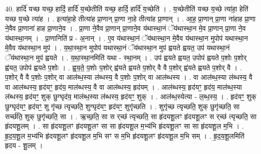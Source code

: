 \documentclass[17pt]{extarticle}
\begin{document}
40. हार्दि॑ यच्छ यच्छ॒ हार्दि॒ हार्दि॑ य॒च्छेतीति॑ यच्छ॒ हार्दि॒ हार्दि॑ य॒च्छेति॑ । . य॒च्छेतीति॑ यच्छ य॒च्छे त्या॑हा॒ हेति॑ यच्छ य॒च्छे त्या॑ह । . इत्या॑हा॒हे तीत्या॑ह प्रा॒णान् प्रा॒णा ना॒हे तीत्या॑ह प्रा॒णान् । . आ॒ह॒ प्रा॒णान् प्रा॒णा ना॑हाह प्रा॒णा ने॒वैव प्रा॒णाना॑ हाह प्रा॒णाने॒व । . प्रा॒णा ने॒वैव प्रा॒णान् प्रा॒णाने॒व य॑थास्था॒नं ॅय॑थास्था॒न मे॒व प्रा॒णान् प्रा॒णा ने॒व य॑थास्था॒नम् । . प्रा॒णानिति॑ प्र - अ॒नान् । . ए॒व य॑थास्था॒नं ॅय॑थास्था॒न मे॒वैव य॑थास्था॒न मुपोप॑ यथास्था॒न मे॒वैव य॑थास्था॒न मुप॑ । . य॒था॒स्था॒न मुपोप॑ यथास्था॒नं ॅय॑थास्था॒न मुप॑ ह्वयते ह्वयत॒ उप॑ यथास्था॒नं ॅय॑थास्था॒न मुप॑ ह्वयते । . य॒था॒स्था॒नमिति॑ यथा - स्था॒नम् । . उप॑ ह्वयते ह्वयत॒ उपोप॑ ह्वयते प॒शोः प॒शोर् ह्व॑यत॒ उपोप॑ ह्वयते प॒शोः । . ह्व॒य॒ते॒ प॒शोः प॒शोर् ह्व॑यते ह्वयते प॒शोर् वै वै प॒शोर् ह्व॑यते ह्वयते प॒शोर् वै । . प॒शोर् वै वै प॒शोः प॒शोर् वा आल॑ब्ध॒स्या ल॑ब्धस्य॒ वै प॒शोः प॒शोर् वा आल॑ब्धस्य । . वा आल॑ब्ध॒स्या ल॑ब्धस्य॒ वै वा आल॑ब्धस्य॒ हृद॑यꣳ॒॒ हृद॑य॒ माल॑ब्धस्य॒ वै वा आल॑ब्धस्य॒ हृद॑यम् । . आल॑ब्धस्य॒ हृद॑यꣳ॒॒ हृद॑य॒ माल॑ब्ध॒स्या ल॑ब्धस्य॒ हृद॑यꣳ॒॒ शुक् छुग्घृद॑य॒ माल॑ब्ध॒स्या ल॑ब्धस्य॒ हृद॑यꣳ॒॒ शुक् । . आल॑ब्ध॒स्येत्या - ल॒ब्ध॒स्य॒ । . हृद॑यꣳ॒॒ शुक् छुग्घृद॑यꣳ॒॒ हृद॑यꣳ॒॒ शु गृ॑च्छ त्यृच्छति॒ शुग्घृद॑यꣳ॒॒ हृद॑यꣳ॒॒ शुगृ॑च्छति । . शुगृ॑च्छ त्यृच्छति॒ शुक् छुगृ॑च्छति॒ सा सर्च्छ॑ति॒ शुक् छुगृ॑च्छति॒ सा । . ऋ॒च्छ॒ति॒ सा स र्‌च्छ॑ त्यृच्छति॒ सा हृ॑दयशू॒लꣳ हृ॑दयशू॒लꣳ स र्‌च्छ॑ त्यृच्छति॒ सा हृ॑दयशू॒लम् । . सा हृ॑दयशू॒लꣳ हृ॑दयशू॒लꣳ सा सा हृ॑दयशू॒ल म॒भ्य॑भि हृ॑दयशू॒लꣳ सा सा हृ॑दयशू॒ल म॒भि । . हृ॒द॒य॒शू॒ल म॒भ्य॑भि हृ॑दयशू॒लꣳ हृ॑दयशू॒ल म॒भि सꣳ स म॒भि हृ॑दयशू॒लꣳ हृ॑दयशू॒ल म॒भि सम् । . हृ॒द॒य॒शू॒लमिति॑ हृदय - शू॒लम् । \newline
\pagebreak
{}
\end{document}
